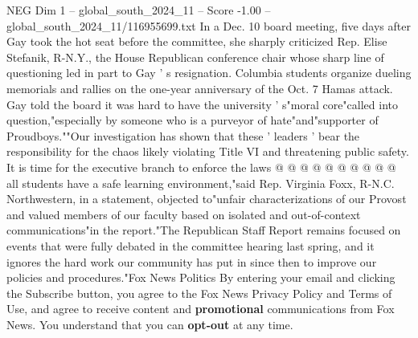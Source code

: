 \begin{textsample}{NEG Dim 1 – global\_south\_2024\_11 – Score -1.00 – global\_south\_2024\_11/116955699.txt}
In a Dec. 10 board meeting, five days after Gay took the hot seat before the committee, she sharply criticized Rep.
Elise Stefanik, R-N.Y., the House Republican conference chair whose sharp line of questioning led in part to Gay ' s resignation.
Columbia students organize dueling memorials and rallies on the one-year anniversary of the Oct. 7 Hamas attack.
Gay told the board it was hard to have the university ' s"moral core"called into question,"especially by someone who is a purveyor of hate"and"supporter of Proudboys.""Our investigation has shown that these ' leaders ' bear the responsibility for the chaos likely violating Title VI and threatening public safety.
It is time for the executive branch to enforce the laws @ @ @ @ @ @ @ @ @ @ all students have a safe learning environment,"said Rep.
Virginia Foxx, R-N.C.
Northwestern, in a statement, objected to"unfair characterizations of our Provost and valued members of our faculty based on isolated and out-of-context communications"in the report."The Republican Staff Report remains focused on events that were fully debated in the committee hearing last spring, and it ignores the hard work our community has put in since then to improve our policies and procedures."Fox News Politics By entering your email and clicking the Subscribe button, you agree to the Fox News Privacy Policy and Terms of Use, and agree to receive content and \textbf{promotional} communications from Fox News.
You understand that you can \textbf{opt-out} at any time.

\end{textsample}
